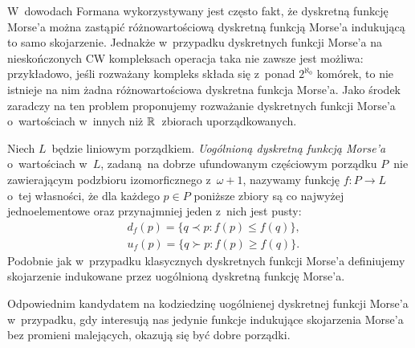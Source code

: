 W~dowodach Formana wykorzystywany jest często fakt, że dyskretną funkcję Morse'a można zastąpić różnowartościową dyskretną funkcją Morse'a indukującą to samo skojarzenie. Jednakże w~przypadku dyskretnych funkcji Morse'a na nieskończonych CW kompleksach operacja taka nie zawsze jest możliwa: przykładowo, jeśli rozważany kompleks składa się z~ponad $2^{\aleph_0}$ komórek, to nie istnieje na nim żadna różnowartościowa dyskretna funkcja Morse'a. Jako środek zaradczy na ten problem proponujemy rozważanie dyskretnych funkcji Morse'a o~wartościach w~innych niż $\mathbb{R}$~zbiorach uporządkowanych. 

Niech $L$~będzie liniowym porządkiem. \textit{Uogólnioną dyskretną funkcją Morse'a} o~wartościach w~$L$, zadaną~na dobrze ufundowanym częściowym porządku $P$~nie zawierającym podzbioru izomorficznego z~$\omega+ 1$, nazywamy funkcję $f\colon P\to L$ o~tej własności, że dla każdego $p\in P$ poniższe zbiory są co najwyżej jednoelementowe oraz przynajmniej jeden z~nich jest pusty:
\begin{align*}
&d_f(p)=\{q\prec p:f(p)\leq f(q)\},\\
&u_f(p)=\{q\succ p:f(p)\geq f(q)\}.
\end{align*}
Podobnie jak w~przypadku klasycznych dyskretnych funkcji Morse'a definiujemy skojarzenie indukowane przez uogólnioną dyskretną funkcję Morse'a.

Odpowiednim kandydatem na kodziedzinę uogólnienej dyskretnej funkcji Morse'a w~przypadku, gdy interesują nas jedynie funkcje indukujące skojarzenia Morse'a bez promieni malejących, okazują się być dobre porządki.

